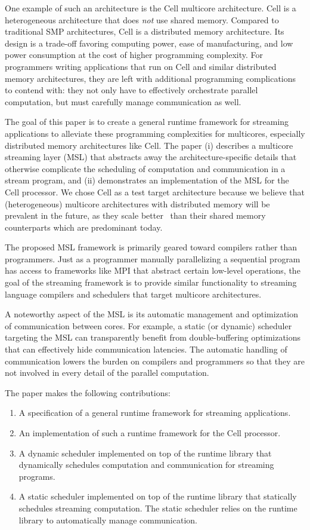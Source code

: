 One example of such an architecture is the Cell multicore
architecture. Cell is a heterogeneous architecture that does
\emph{not} use shared memory. Compared to traditional SMP
architectures, Cell is a distributed memory architecture. Its design
is a trade-off favoring computing power, ease of manufacturing, and
low power consumption at the cost of higher programming
complexity. For programmers writing applications that run on Cell and
similar distributed memory architectures, they are left with
additional programming complications to contend with: they not only
have to effectively orchestrate parallel computation, but must
carefully manage communication as well.

The goal of this paper is to create a general runtime framework for
streaming applications to alleviate these programming complexities for
multicores, especially distributed memory architectures like Cell. The
paper (i) describes a multicore streaming layer (MSL) that abstracts
away the architecture-specific details that otherwise complicate the
scheduling of computation and communication in a stream program, and
(ii) demonstrates an implementation of the MSL for the Cell
processor. We chose Cell as a test target architecture because we
believe that (heterogeneous) multicore architectures with distributed
memory will be prevalent in the future, as they scale
better~\cite{theo-phd-07} than their shared memory counterparts which
are predominant today.

The proposed MSL framework is primarily geared toward compilers rather
than programmers. Just as a programmer manually parallelizing a
sequential program has access to frameworks like MPI that abstract
certain low-level operations, the goal of the streaming framework is
to provide similar functionality to streaming language compilers and
schedulers that target multicore architectures. 

A noteworthy aspect of the MSL is its automatic management and
optimization of communication between cores. For example, a static (or
dynamic) scheduler targeting the MSL can transparently benefit from
double-buffering optimizations that can effectively hide communication
latencies. The automatic handling of communication lowers the burden
on compilers and programmers so that they are not involved in every
detail of the parallel computation.

The paper makes the following contributions:
\begin{enumerate}
\item A specification of a general runtime framework for streaming applications.
\item An implementation of such a runtime framework for the Cell processor.
\item A dynamic scheduler implemented on top of the runtime library
  that dynamically schedules computation and communication for
  streaming programs.
\item A static scheduler implemented on top of the runtime library
  that statically schedules streaming computation. The static
  scheduler relies on the runtime library to automatically manage
  communication.
\end{enumerate}

